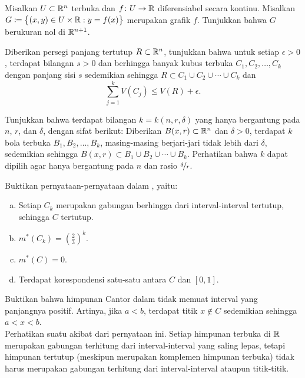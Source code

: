 \begin{exercise}
Misalkan $U\subset{\mathbb{R}}^n$ terbuka dan $f\colon U\to{\mathbb{R}}$ diferensiabel secara
kontinu. Misalkan
$G\coloneqq\bigl\{(x,y)\in U\times{\mathbb{R}}:y=f(x)\bigr\}$ merupakan grafik $f$.
Tunjukkan bahwa $G$ berukuran nol di ${\mathbb{R}}^{n+1}$.
\end{exercise}

\begin{exercise}
Diberikan persegi panjang tertutup $R\subset{\mathbb{R}}^n$, tunjukkan bahwa untuk
setiap $\epsilon>0$, terdapat bilangan $s>0$ dan berhingga banyak kubus terbuka
$C_1,C_2,\ldots,C_k$ dengan panjang sisi $s$ sedemikian sehingga
$R\subset C_1\cup C_2\cup\cdots\cup C_k$ dan
\begin{equation*}
\sum_{j=1}^k V(C_j) \leq V(R) + \epsilon .
\end{equation*}
\end{exercise}

\begin{exercise}
Tunjukkan bahwa terdapat bilangan $k=k(n,r,\delta)$ yang hanya bergantung pada
$n$, $r$, dan $\delta$, dengan sifat berikut: Diberikan
$B(x,r)\subset{\mathbb{R}}^n$ dan $\delta>0$, terdapat $k$ bola terbuka
$B_1,B_2,\ldots,B_k$, masing-masing berjari-jari tidak lebih dari $\delta$,
sedemikian sehingga $B(x,r)\subset B_1\cup B_2\cup\cdots\cup B_k$.
Perhatikan bahwa $k$ dapat dipilih agar hanya bergantung pada $n$ dan rasio
$\nicefrac{\delta}{r}$.
\end{exercise}

\begin{exercise}[Menantang]
Buktikan pernyataan-pernyataan dalam , yaitu:
\begin{enumerate}[a)]
\item
Setiap $C_k$ merupakan gabungan berhingga dari interval-interval tertutup,
sehingga $C$ tertutup.
\item
$m^*(C_k) = {\left(\frac{2}{3}\right)}^k$.
\item
$m^*(C) = 0$.
\item
Terdapat korespondensi satu-satu antara $C$ dan $[0,1]$.
\end{enumerate}
\end{exercise}

\begin{exercise}
\pagebreak[3]
Buktikan bahwa himpunan Cantor dalam  tidak memuat
interval yang panjangnya positif. Artinya, jika $a<b$, terdapat titik
$x\notin C$ sedemikian sehingga $a<x<b$.
\\
Perhatikan suatu akibat dari pernyataan ini. Setiap himpunan terbuka di ${\mathbb{R}}$
merupakan gabungan terhitung dari interval-interval yang saling lepas, tetapi
himpunan tertutup (meskipun merupakan komplemen himpunan terbuka) tidak harus
merupakan gabungan terhitung dari interval-interval ataupun titik-titik.
\end{exercise}

